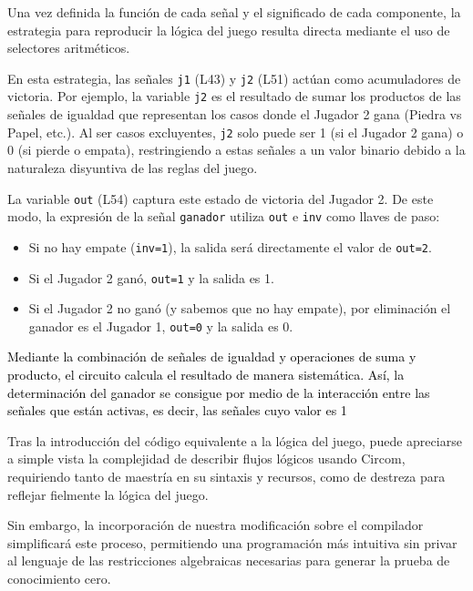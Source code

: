 \documentclass[a4paper,12pt]{report}
\begin{document}
	
	\noindent Una vez definida la función de cada señal y el significado de cada componente, la estrategia para reproducir la lógica del juego resulta directa mediante el uso de selectores aritméticos.
	
	\vspace{0.2cm}
	\noindent En esta estrategia, las señales \texttt{j1} (L43) y \texttt{j2} (L51) actúan como acumuladores de victoria. Por ejemplo, la variable \texttt{j2} es el resultado de sumar los productos de las señales de igualdad que representan los casos donde el Jugador 2 gana (Piedra vs Papel, etc.). Al ser casos excluyentes, \texttt{j2} solo puede ser 1 (si el Jugador 2 gana) o 0 (si pierde o empata), restringiendo a estas señales a un valor binario debido a la naturaleza  disyuntiva de las reglas del juego.
	
	\vspace{0.2cm}
	\noindent La variable \texttt{out} (L54) captura este estado de victoria del Jugador 2. De este modo, la expresión de la señal \texttt{ganador} utiliza \texttt{out} e \texttt{inv} como llaves de paso: 
	
	\begin{itemize}
		\item Si no hay empate (\texttt{inv=1}), la salida será directamente el valor de \texttt{out=2}.
		\item Si el Jugador 2 ganó, \texttt{out=1} y la salida es 1.
		\item Si el Jugador 2 no ganó (y sabemos que no hay empate), por eliminación el ganador es el Jugador 1, \texttt{out=0} y la salida es 0.
	\end{itemize}
	
	
	\vspace{0.2cm}
	\noindent \textcolor{black}{Mediante la combinación de señales de igualdad y operaciones de suma y producto, el circuito calcula el resultado de manera sistemática. Así, la determinación del ganador se consigue por medio de la interacción entre las señales que están activas, es decir, las señales cuyo valor es 1}
	
	
	\vspace{0.2cm}
	\noindent Tras la introducción del código equivalente a la lógica del juego, puede apreciarse a simple vista la complejidad de describir flujos lógicos usando Circom, requiriendo tanto de maestría en su sintaxis y recursos, como de destreza para reflejar fielmente la lógica del juego.
	
	\vspace{0.2cm}
	\noindent Sin embargo, la incorporación de nuestra modificación sobre el compilador simplificará este proceso, permitiendo una programación más intuitiva sin privar al lenguaje de las restricciones algebraicas necesarias para generar la prueba de conocimiento cero.
	
\end{document}

